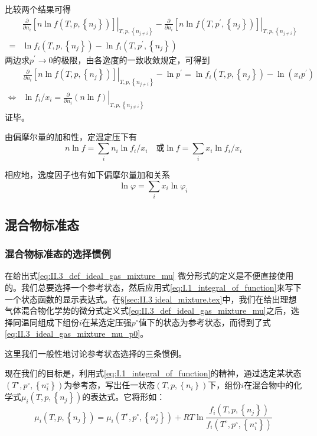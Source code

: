 \documentclass[main.tex]{subfiles}
\begin{document}
比较两个结果可得
\begin{align*}
      & \left.\frac{\partial}{\partial n_i}\left[n\ln f\left(T,p,\left\{n_j\right\}\right)\right]\right|_{T,p,\left\{n_{j\neq i}\right\}}-\left.\frac{\partial}{\partial n_i}\left[n\ln f\left(T,p^\prime,\left\{n_j\right\}\right)\right]\right|_{T,p,\left\{n_{j\neq i}\right\}} \\
    = & \ln f_i\left(T,p,\left\{n_j\right\}\right)-\ln f_i\left(T,p^\prime,\left\{n_j\right\}\right)
\end{align*}
两边求$p^\prime\rightarrow 0$的极限，由各逸度的一致收敛规定，可得到
\begin{align*}
                    & \left.\frac{\partial}{\partial n_i}\left[n\ln f\left(T,p,\left\{n_j\right\}\right)\right]\right|_{T,p,\left\{n_{j\neq i}\right\}}-\ln p^\prime=\ln f_i\left(T,p,\left\{n_j\right\}\right)-\ln\left(x_ip^\prime\right) \\
    \Leftrightarrow & \ln f_i/x_i=\left.\frac{\partial}{\partial n_i}\left(n\ln f\right)\right|_{T,p,\left\{n_{j\neq i}\right\}}
\end{align*}
证毕。

由偏摩尔量的加和性，定温定压下有
\[n\ln f=\sum_i n_i\ln f_i/x_i\quad\text{或}\ln f=\sum_ix_i\ln f_i/x_i\]

相应地，逸度因子也有如下偏摩尔量加和关系
\[\ln \varphi=\sum_ix_i\ln\varphi_i\]

\subsection{混合物标准态}
\subsubsection{混合物标准态的选择惯例}
在给出式\eqref{eq:II.3_def_ideal_gas_mixture_mu}
微分形式的定义是不便直接使用的。我们总要选择一个参考状态，然后应用式\eqref{eq:I.1_integral_of_function}来写下一个状态函数的显示表达式。在\S\ref{sec:II.3 ideal_mixture.tex}中，我们在给出理想气体混合物化学势的微分式定义式\eqref{eq:II.3_def_ideal_gas_mixture_mu}之后，选择同温同组成下组份$i$在某选定压强$p^\circ$值下的状态为参考状态，而得到了式\eqref{eq:II.3_ideal_gas_mixture_mu_p0}。

这里我们一般性地讨论参考状态选择的三条惯例。

现在我们的目标是，利用式\eqref{eq:I.1_integral_of_function}的精神，通过选定某状态$\left(T^\circ,p^\circ,\left\{n_i^\circ\right\}\right)$为参考态，写出任一状态$\left(T,p,\left\{n_i\right\}\right)$下，组份$i$在混合物中的化学式$\mu_i\left(T,p,\left\{n_j\right\}\right)$的表达式。它将形如：
\begin{equation*}
    \mu_i\left(T,p,\left\{n_j\right\}\right)=\mu_i\left(T^\circ,p^\circ,\left\{n_j^\circ\right\}\right)+RT\ln\frac{f_i\left(T,p,\left\{n_j\right\}\right)}{f_i\left(T^\circ,p^\circ,\left\{n_i^\circ\right\}\right)}
\end{equation*}
\end{document}
